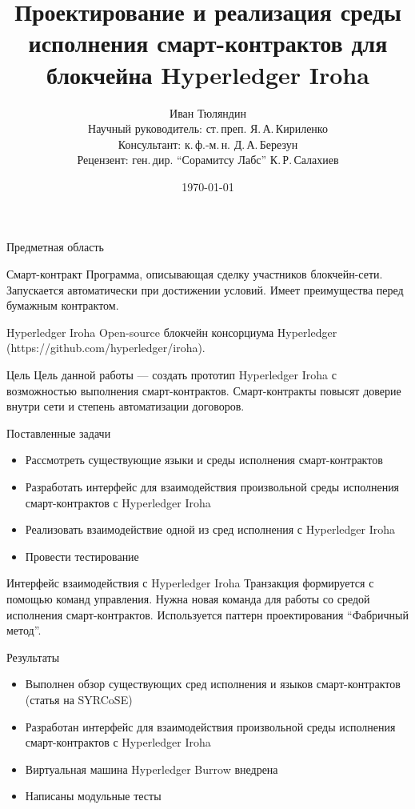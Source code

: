 \documentclass[hyperref={pdfpagelabels=false}]{beamer}
\title[Смарт-контракты для Hyperledger Iroha]{Проектирование и реализация среды исполнения смарт-контрактов для блокчейна Hyperledger Iroha}
\author[И. Тюляндин]{Иван Тюляндин\\%
Научный руководитель: ст.\,преп. Я.\,А.\,Кириленко\\%
Консультант: к.\,ф.-м.\,н. Д.\,А.\,Березун\\%
Рецензент: ген.\,дир. “Сорамитсу Лабс” К.\,Р.\,Салахиев%
}
\date{\today}
\begin{document}
{
}

\begin{frame}{Предметная область}
\begin{block}{Смарт-контракт} 
Программа, описывающая сделку участников блокчейн-сети. Запускается автоматически при достижении условий. 
Имеет преимущества перед бумажным контрактом.
\end{block}
\vfill
\begin{block}{Hyperledger Iroha}
Open-source блокчейн консорциума Hyperledger (https://github.com/hyperledger/iroha).
\end{block}
\end{frame} 

\begin{frame}{Цель}
Цель данной работы — создать прототип Hyperledger Iroha с возможностью выполнения смарт-контрактов.
\vfill
Смарт-контракты повысят доверие внутри сети и степень автоматизации договоров.
\end{frame} 

\begin{frame}{Поставленные задачи}
\begin{itemize}
\item Рассмотреть существующие языки и среды исполнения смарт-контрактов
\vfill
\item Разработать интерфейс для взаимодействия произвольной среды исполнения смарт-контрактов с Hyperledger Iroha
\vfill
\item Реализовать взаимодействие одной из сред исполнения с Hyperledger Iroha
\vfill
\item Провести тестирование
\end{itemize}

\end{frame} 

\begin{frame}{Интерфейс взаимодействия с Hyperledger Iroha}
Транзакция формируется с помощью команд управления.
\vfill
Нужна новая команда для работы со средой исполнения смарт-контрактов. 
Используется паттерн проектирования “Фабричный метод”.

\end{frame} 

\begin{frame}{Результаты}
\begin{itemize}
\item Выполнен обзор существующих сред исполнения и языков смарт-контрактов (статья на SYRCoSE)
\vfill
\item Разработан интерфейс для взаимодействия произвольной среды исполнения смарт-контрактов с Hyperledger Iroha
\vfill
\item Виртуальная машина Hyperledger Burrow внедрена
\vfill
\item Написаны модульные тесты 
\end{itemize}
\end{frame} 
\end{document}
